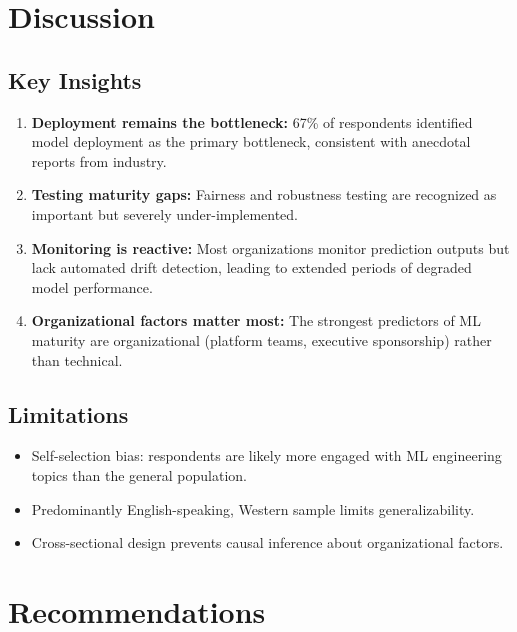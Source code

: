 \documentclass[
    language=english,
    doctype=survey-report,
    institution=none,
]{../../omnilatex}
\begin{document}
\section{Discussion}
\label{sec:discussion}

\subsection{Key Insights}

\begin{enumerate}
    \item \textbf{Deployment remains the bottleneck:} 67\% of respondents
          identified model deployment as the primary bottleneck, consistent
          with anecdotal reports from industry.
    \item \textbf{Testing maturity gaps:} Fairness and robustness testing
          are recognized as important but severely under-implemented.
    \item \textbf{Monitoring is reactive:} Most organizations monitor
          prediction outputs but lack automated drift detection, leading
          to extended periods of degraded model performance.
    \item \textbf{Organizational factors matter most:} The strongest
          predictors of ML maturity are organizational (platform teams,
          executive sponsorship) rather than technical.
\end{enumerate}

\subsection{Limitations}

\begin{itemize}
    \item Self-selection bias: respondents are likely more engaged with
          ML engineering topics than the general population.
    \item Predominantly English-speaking, Western sample limits
          generalizability.
    \item Cross-sectional design prevents causal inference about
          organizational factors.
\end{itemize}

\section{Recommendations}
\label{sec:recommendations}
\end{document}
